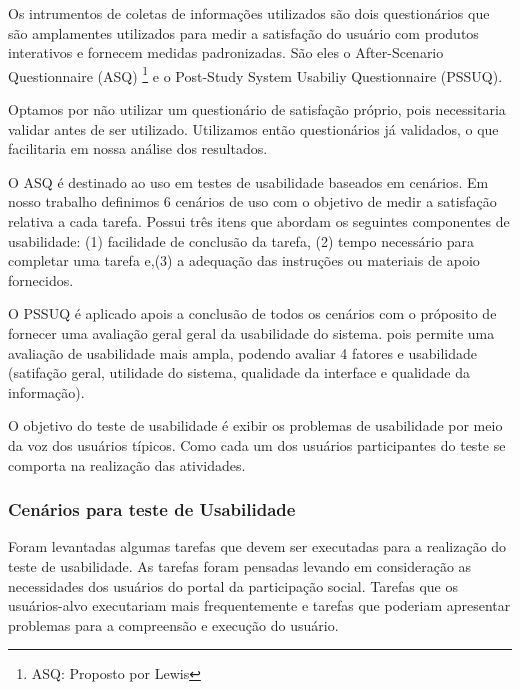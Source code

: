 	Os intrumentos de coletas de informações utilizados são dois questionários que são amplamentes utilizados para medir a satisfação do usuário com produtos interativos e fornecem medidas padronizadas. São eles o After-Scenario Questionnaire (ASQ) \footnote{ASQ: Proposto por Lewis} e o Post-Study System Usabiliy Questionnaire (PSSUQ). 

	Optamos por não utilizar um questionário de satisfação próprio, pois necessitaria validar antes de ser utilizado.  Utilizamos então questionários já validados, o que facilitaria em nossa análise dos resultados.

	O ASQ é destinado ao uso em testes de usabilidade baseados em cenários. Em nosso trabalho definimos 6 cenários de uso com o objetivo de medir a satisfação relativa a cada tarefa. Possui três itens que abordam os seguintes componentes de usabilidade: (1) facilidade de conclusão da tarefa, (2) tempo necessário para completar uma tarefa e,(3) a adequação das instruções ou materiais de apoio fornecidos.

	O PSSUQ é aplicado apois a conclusão de todos os cenários com o próposito de fornecer uma avaliação geral geral da usabilidade do sistema. pois permite uma avaliação de usabilidade mais ampla, podendo avaliar 4 fatores e usabilidade (satifação geral, utilidade do sistema, qualidade da interface e qualidade da informação). 

	O objetivo do teste de usabilidade é exibir os problemas de usabilidade por meio da voz dos usuários típicos. Como cada um dos usuários participantes do teste se comporta na realização das atividades.

\subsubsection{Cenários para teste de Usabilidade}

	Foram levantadas algumas tarefas que devem ser executadas para a realização do teste de usabilidade. As tarefas foram pensadas levando em consideração as necessidades dos usuários do portal da participação social. Tarefas que os usuários-alvo executariam mais frequentemente e tarefas que poderiam apresentar problemas para a compreensão e execução do usuário. 


